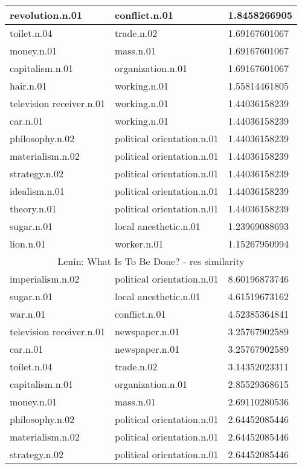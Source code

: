 \begin{center}
\begin{tabular}{ | l | l | l |}
revolution.n.01 & conflict.n.01 & 1.8458266905 \\ \hline
toilet.n.04 & trade.n.02 & 1.69167601067 \\ \hline
money.n.01 & mass.n.01 & 1.69167601067 \\ \hline
capitalism.n.01 & organization.n.01 & 1.69167601067 \\ \hline
hair.n.01 & working.n.01 & 1.55814461805 \\ \hline
television receiver.n.01 & working.n.01 & 1.44036158239 \\ \hline
car.n.01 & working.n.01 & 1.44036158239 \\ \hline
philosophy.n.02 & political orientation.n.01 & 1.44036158239 \\ \hline
materialism.n.02 & political orientation.n.01 & 1.44036158239 \\ \hline
strategy.n.02 & political orientation.n.01 & 1.44036158239 \\ \hline
idealism.n.01 & political orientation.n.01 & 1.44036158239 \\ \hline
theory.n.01 & political orientation.n.01 & 1.44036158239 \\ \hline
sugar.n.01 & local anesthetic.n.01 & 1.23969088693 \\ \hline
lion.n.01 & worker.n.01 & 1.15267950994 \\ \hline
\multicolumn{3}{|c|}{Lenin: What Is To Be Done? - res similarity} \\ \hline
imperialism.n.02 & political orientation.n.01 & 8.60196873746 \\ \hline
sugar.n.01 & local anesthetic.n.01 & 4.61519673162 \\ \hline
war.n.01 & conflict.n.01 & 4.52385364841 \\ \hline
television receiver.n.01 & newspaper.n.01 & 3.25767902589 \\ \hline
car.n.01 & newspaper.n.01 & 3.25767902589 \\ \hline
toilet.n.04 & trade.n.02 & 3.14352023311 \\ \hline
capitalism.n.01 & organization.n.01 & 2.85529368615 \\ \hline
money.n.01 & mass.n.01 & 2.69110280536 \\ \hline
philosophy.n.02 & political orientation.n.01 & 2.64452085446 \\ \hline
materialism.n.02 & political orientation.n.01 & 2.64452085446 \\ \hline
strategy.n.02 & political orientation.n.01 & 2.64452085446 \\ \hline

\end{tabular}
\end{center}

